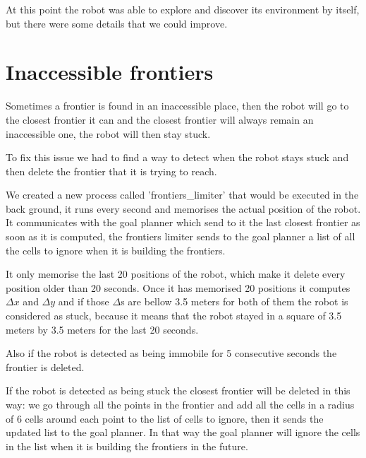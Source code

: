 At this point the robot was able to explore and discover its environment by itself, but there were some details that we could improve.

\section{Inaccessible frontiers}

Sometimes a frontier is found in an inaccessible place, then the robot will go to the closest frontier it can and the closest frontier will always remain an inaccessible one, the robot will then stay stuck.

To fix this issue we had to find a way to detect when the robot stays stuck and then delete the frontier that it is trying to reach.

We created a new process called 'frontiers\_limiter' that would be executed in the back ground, it runs every second and memorises the actual position of the robot.
It communicates with the goal planner which send to it the last closest frontier as soon as it is computed, the frontiers limiter sends to the goal planner a list of all the cells to ignore when it is building the frontiers.

It only memorise the last 20 positions of the robot, which make it delete every position older than 20 seconds.
Once it has memorised 20 positions it computes $\Delta x$ and $\Delta y$ and if those $\Delta$s are bellow 3.5 meters for both of them the robot is considered as stuck, because it means that the robot stayed in a square of 3.5 meters by 3.5 meters for the last 20 seconds.

Also if the robot is detected as being immobile for 5 consecutive seconds the frontier is deleted.

If the robot is detected as being stuck the closest frontier will be deleted in this way: we go through all the points in the frontier and add all the cells in a radius of 6 cells around each point to the list of cells to ignore, then it sends the updated list to the goal planner.
In that way the goal planner will ignore the cells in the list when it is building the frontiers in the future.

